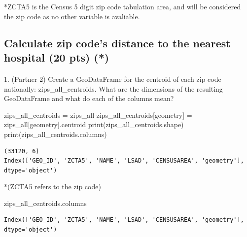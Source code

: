 \documentclass[
  letterpaper,
  DIV=11,
  numbers=noendperiod]{scrartcl}
\makeatletter
\let\oldparagraph\paragraph
\renewcommand{\paragraph}{
    \@ifstar
      \xxxParagraphStar
      \xxxParagraphNoStar
  }
\newcommand{\xxxParagraphStar}[1]{\oldparagraph*{#1}\mbox{}}
\newcommand{\xxxParagraphNoStar}[1]{\oldparagraph{#1}\mbox{}}
\newenvironment{Shaded}{\begin{snugshade}}{\end{snugshade}}
\newcommand{\BuiltInTok}[1]{\textcolor[rgb]{0.00,0.23,0.31}{#1}}
\newcommand{\NormalTok}[1]{\textcolor[rgb]{0.00,0.23,0.31}{#1}}
\newcommand{\OperatorTok}[1]{\textcolor[rgb]{0.37,0.37,0.37}{#1}}
\newcommand{\StringTok}[1]{\textcolor[rgb]{0.13,0.47,0.30}{#1}}
\makeatother
\begin{document}
*ZCTA5 is the Census 5 digit zip code tabulation area, and will be
considered the zip code as no other variable is avaliable.

\subsection{Calculate zip code's distance to the nearest hospital (20
pts)
(*)}\label{calculate-zip-codes-distance-to-the-nearest-hospital-20-pts}

\paragraph{1. (Partner 2) Create a GeoDataFrame for the centroid of each
zip code nationally: zips\_all\_centroids. What are the dimensions of
the resulting GeoDataFrame and what do each of the columns
mean?}\label{partner-2-create-a-geodataframe-for-the-centroid-of-each-zip-code-nationally-zips_all_centroids.-what-are-the-dimensions-of-the-resulting-geodataframe-and-what-do-each-of-the-columns-mean}

\begin{Shaded}
\begin{Highlighting}[]
\NormalTok{zips\_all\_centroids }\OperatorTok{=}\NormalTok{ zips\_all}
\NormalTok{zips\_all\_centroids[}\StringTok{\textquotesingle{}geometry\textquotesingle{}}\NormalTok{] }\OperatorTok{=}\NormalTok{ zips\_all[}\StringTok{\textquotesingle{}geometry\textquotesingle{}}\NormalTok{].centroid}
\BuiltInTok{print}\NormalTok{(zips\_all\_centroids.shape)}
\BuiltInTok{print}\NormalTok{(zips\_all\_centroids.columns)}
\end{Highlighting}
\end{Shaded}

\begin{verbatim}
(33120, 6)
Index(['GEO_ID', 'ZCTA5', 'NAME', 'LSAD', 'CENSUSAREA', 'geometry'], dtype='object')
\end{verbatim}

*(ZCTA5 refers to the zip code)

\begin{Shaded}
\begin{Highlighting}[]
\NormalTok{zips\_all\_centroids.columns}
\end{Highlighting}
\end{Shaded}

\begin{verbatim}
Index(['GEO_ID', 'ZCTA5', 'NAME', 'LSAD', 'CENSUSAREA', 'geometry'], dtype='object')
\end{verbatim}
\end{document}
